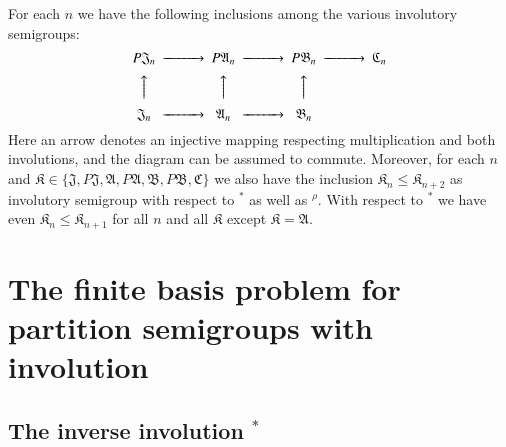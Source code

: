 \documentclass[preprint,1p,times]{elsarticle}
\numberwithin{equation}{section}
\theoremstyle{remark}
\def\A{\mathfrak{A}}
\def\C{\mathfrak{C}}
\def\B{\mathfrak{B}}
\def\J{\mathfrak{J}}
\def\K{\mathfrak{K}}
\begin{document}
For each $n$ we have the following inclusions among the various involutory semigroups:
\[
\begin{CD}
P\J_n @>>> P\A_n @>>> P\B_n @>>> \C_n\\
@AAA        @AAA       @AAA\\
\J_n @>>>   \A_n @>>> \B_n
\end{CD}
\]
Here an arrow denotes an injective mapping respecting multiplication and both involutions, and the diagram can be assumed to commute.
Moreover, for each $n$ and $\K\in\{\J,P\J,\A,P\A,\B,P\B,\C\}$ we also have the inclusion $\K_n\le\K_{n+2}$ as
involutory semigroup with respect to $^*$ as well as $^\rho$. With respect to $^*$ we have even $\K_n\le\K_{n+1}$ for
all $n$ and all $\K$ except $\K=\A$.

\section{The finite basis problem for partition semigroups with involution}

\subsection{The inverse involution $^*$}\label{inverse involution}
\end{document}
